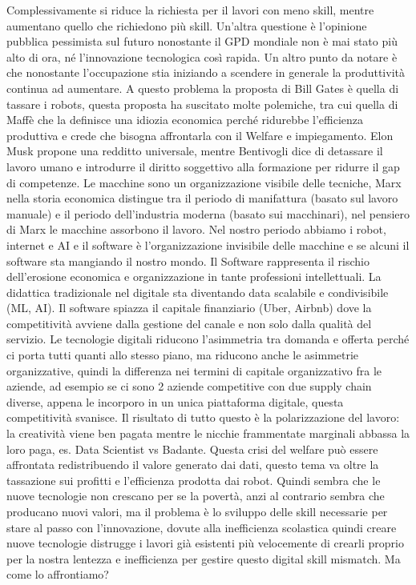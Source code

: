 \documentclass[11pt, a4page, twocolumn]{article}
\begin{document}
Complessivamente si riduce la richiesta per il lavori con meno skill, mentre aumentano quello che richiedono più skill.
Un’altra questione è l’opinione pubblica pessimista sul futuro nonostante il GPD mondiale non è mai stato più alto di ora, né l’innovazione tecnologica così rapida.
Un altro punto da notare è che nonostante l’occupazione stia iniziando a scendere in generale la produttività continua ad aumentare.
A questo problema la proposta di Bill Gates è quella di tassare i robots, questa proposta ha suscitato molte polemiche, tra cui quella di Maffè che la definisce una idiozia economica perché ridurebbe l’efficienza produttiva e crede che bisogna affrontarla con il Welfare e impiegamento. Elon Musk propone una redditto universale, mentre Bentivogli dice di detassare il lavoro umano e introdurre il diritto soggettivo alla formazione per ridurre il gap di competenze.
Le macchine sono un organizzazione visibile delle tecniche, Marx nella storia economica distingue tra il periodo di manifattura (basato sul lavoro manuale) e il periodo dell’industria moderna (basato sui macchinari), nel pensiero di Marx le macchine assorbono il lavoro. Nel nostro periodo abbiamo i robot, internet e AI e il software è l’organizzazione invisibile delle macchine e se alcuni il software sta mangiando il nostro mondo. Il Software rappresenta il rischio dell’erosione economica e organizzazione in tante professioni intellettuali. La didattica tradizionale nel digitale sta diventando data scalabile e condivisibile (ML, AI). Il software spiazza il capitale finanziario (Uber, Airbnb) dove la competitività avviene dalla gestione del canale e non solo dalla qualità del servizio. 
Le tecnologie digitali riducono l’asimmetria tra domanda e offerta perché ci porta tutti quanti allo stesso piano, ma riducono anche le asimmetrie organizzative, quindi la differenza nei termini di capitale organizzativo fra le aziende, ad esempio se ci sono 2 aziende competitive con due supply chain diverse, appena le incorporo in un unica piattaforma digitale, questa competitività svanisce. 
Il risultato di tutto questo è la polarizzazione del lavoro: la creatività viene ben pagata mentre le nicchie frammentate marginali abbassa la loro paga, es. Data Scientist vs Badante.
Questa crisi del welfare può essere affrontata redistribuendo il valore generato dai dati, questo tema va oltre la tassazione sui profitti e l’efficienza prodotta dai robot.
Quindi sembra che le nuove tecnologie non crescano per se la povertà, anzi al contrario sembra che producano nuovi valori, ma il problema è lo sviluppo delle skill necessarie per stare al passo con l’innovazione, dovute alla inefficienza scolastica quindi creare nuove tecnologie distrugge i lavori già esistenti più velocemente di crearli proprio per la nostra lentezza e inefficienza per gestire questo digital skill mismatch. Ma come lo affrontiamo?
\end{document}
